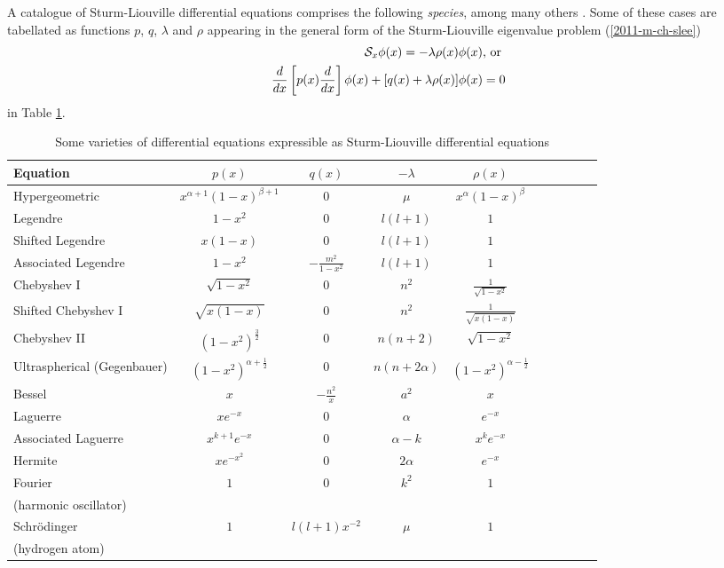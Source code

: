 A catalogue of Sturm-Liouville differential equations
comprises the following {\it species}, among many others \cite{arfken05,Al-Gwaiz,everitt-handbook-sl}.
Some of these cases are
tabellated as functions   $p$, $q$, $\lambda$ and $\rho$ appearing in the general form
of the Sturm-Liouville eigenvalue problem  (\ref{2011-m-ch-slee})
\begin{equation}
\begin{split}
{\cal S}_{x}    \phi (x) = -\lambda \rho  (x) \phi (x)\textrm{, or } \\
\frac{d}{dx}
\left[
p(x)
\frac{d}{dx}
\right] \phi(x)
+
[q(x)  +   \lambda \rho  (x) ]\phi(x)=0
\end{split}
\end{equation}
in Table \ref{2011-m-sl-t-varieties}.
\begin{table}
{\footnotesize
\begin{tabular}{lccccccccc}
\hline\hline
Equation & $ p(x)$ & $q(x)$ & $-\lambda$ & $\rho (x)$\\
\hline
Hypergeometric  & $x^{\alpha+1}(1-x)^{\beta +1} $ &   $0$ &  $ \mu $ &  $x^{\alpha}(1-x)^{\beta }$
\\
Legendre  & $1-x^2 $ &   $0$ &  $l(l+1) $ &  $1$
\\
Shifted Legendre    & $ x(1-x)$ &   $0$ &  $l(l+1) $ &  $1$
\\
Associated Legendre    & $1-x^2 $ &   $-\frac{m^2}{1-x^2}$ &  $l(l+1) $ &  $1$
\\
Chebyshev I   & $\sqrt{1-x^2} $ &   $0$ &  $n^2 $ &  $ \frac{1}{\sqrt{1-x^2}}$
\\
Shifted Chebyshev I   & $\sqrt{x(1-x)} $ &   $0$ &  $n^2 $ &  $ \frac{1}{\sqrt{x(1-x)}}$
\\
Chebyshev II   & $(1-x^2)^\frac{3}{2} $ &   $0$ &  $n(n+2) $ &  $  \sqrt{1-x^2} $
\\
Ultraspherical (Gegenbauer)   & $(1-x^2)^{\alpha + \frac{1}{2}} $ &   $0$ &  $n(n+2\alpha ) $ &  $  (1-x^2)^{\alpha - \frac{1}{2}}$
\\
Bessel   & $ x$ &   $-\frac{n^2}{x}$ &  $a^2 $ &  $ x$
\\
Laguerre   & $x e^{-x} $ &   $0$ &  $\alpha $ &  $e^{-x} $
\\
Associated Laguerre     & $x^{k+1} e^{-x} $ &   $0$ &  $\alpha -k$ &  $x^ke^{-x} $
\\
Hermite     & $x e^{-x^2} $ &   $0$ &  $2\alpha $ &  $e^{-x} $
\\
Fourier    & $1 $ &   $0$ &  $ k^2 $ &  $1$
\\
(harmonic oscillator)    &   &     &  $  $ &  $ $  \\
Schr\"odinger    & $1 $ &   $l(l+1)x^{-2}$ &  $ \mu $ &  $1$
\\
(hydrogen atom)    &   &     &  $  $ &  $ $  \\
\hline\hline
\end{tabular}
}
\caption{Some varieties of differential equations expressible as Sturm-Liouville differential equations}
\label{2011-m-sl-t-varieties}
\end{table}

